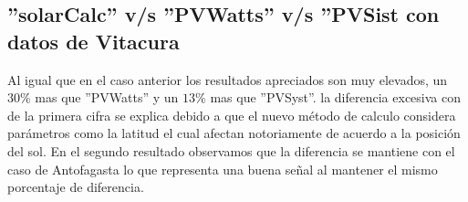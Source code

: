 \newpage
\subsection{''solarCalc'' v/s ''PVWatts'' v/s ''PVSist con datos de Vitacura}
\begin{table}[h!]
\caption{Comparación de software con datos de Vitacura}
\end{table}
Al igual que en el caso anterior los resultados apreciados son muy elevados, un $30\%$ mas que ''PVWatts'' y un $13\%$ mas que ''PVSyst''. la diferencia excesiva con de la primera cifra se explica debido a que el nuevo método de calculo considera parámetros como la latitud el cual afectan notoriamente de acuerdo a la posición del sol. En el segundo resultado observamos que la diferencia se mantiene con el caso de Antofagasta lo que representa una buena señal al mantener el mismo porcentaje de diferencia.

\newpage
